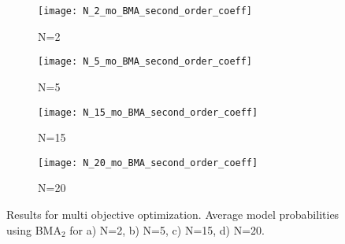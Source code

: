 \documentclass[preprint,amsmath,amssymb,aps, prb,showkeys]{revtex4-1}
\begin{document}
\begin{figure}[htp]
        \parbox{.975\textwidth}{
            \begin{subfigure}{.475\linewidth}
                \texttt{[image: N\_2\_mo\_BMA\_second\_order\_coeff]}
                \caption{N=2}
                \label{fig:mo_so_coeff_N_2_BMA}
        \end{subfigure}
            \begin{subfigure}{.475\linewidth}
                \texttt{[image: N\_5\_mo\_BMA\_second\_order\_coeff]}
                \caption{N=5}
                \label{fig:mo_so_coeff_N_5_BMA}
        \end{subfigure}
            \begin{subfigure}{.475\linewidth}
                \texttt{[image: N\_15\_mo\_BMA\_second\_order\_coeff]}
                \caption{N=15}
                \label{fig:mo_so_coeff_N_15_BMA}
        \end{subfigure}
            \begin{subfigure}{.475\linewidth}
                \texttt{[image: N\_20\_mo\_BMA\_second\_order\_coeff]}
                \caption{N=20}
                \label{fig:mo_so_coeff_N_20_BMA}
        \end{subfigure}
        }
        \caption{ Results for multi objective optimization. Average model probabilities using BMA$_2$ for a) N=2, b) N=5, c) N=15, d) N=20.}
        \label{fig:mo_so_coeff_BMA}
     
\end{figure} 

\end{document}
